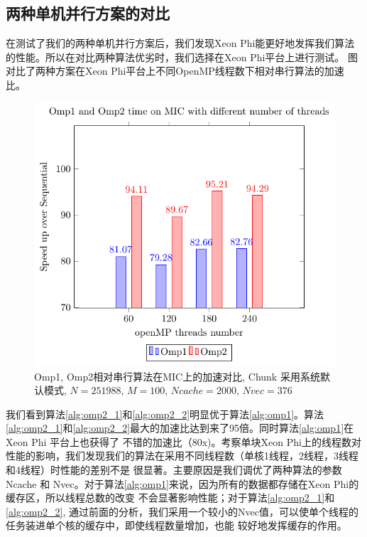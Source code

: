 \subsection{两种单机并行方案的对比} %
\label{sub:compareV1V2}

在测试了我们的两种单机并行方案后，我们发现Xeon Phi能更好地发挥我们算法的性能。所以在对比两种算法优劣时，我们选择在Xeon Phi平台上进行测试。
图\label{fig:compareV1V2}对比了两种方案在Xeon Phi平台上不同OpenMP线程数下相对串行算法的加速比。
\begin{figure}[!t]
   \centering
   \includegraphics[width=\textwidth]{chap5/Figures/BS-Core-bar.pdf}
   \caption{Omp1, Omp2相对串行算法在MIC上的加速对比, Chunk 采用系统默认模式, $N=251988$, $M=100$, $Ncache=2000$, $Nvec=376$}
   \label{fig:compareV1V2}
\end{figure}
我们看到算法\ref{alg:omp2_1}和\ref{alg:omp2_2}明显优于算法\ref{alg:omp1}。算法\ref{alg:omp2_1}和\ref{alg:omp2_2}最大的加速比达到来了95倍。同时算法\ref{alg:omp1}在Xeon Phi 平台上也获得了
不错的加速比（80x)。考察单块Xeon Phi上的线程数对性能的影响，我们发现我们的算法在采用不同线程数（单核1线程，2线程，3线程和4线程）时性能的差别不是
很显著。主要原因是我们调优了两种算法的参数Ncache 和 Nvec。对于算法\ref{alg:omp1}来说，因为所有的数据都存储在Xeon Phi的缓存区，所以线程总数的改变
不会显著影响性能；对于算法\ref{alg:omp2_1}和\ref{alg:omp2_2}, 通过前面的分析，我们采用一个较小的Nvec值，可以使单个线程的任务装进单个核的缓存中，即使线程数量增加，也能
较好地发挥缓存的作用。

